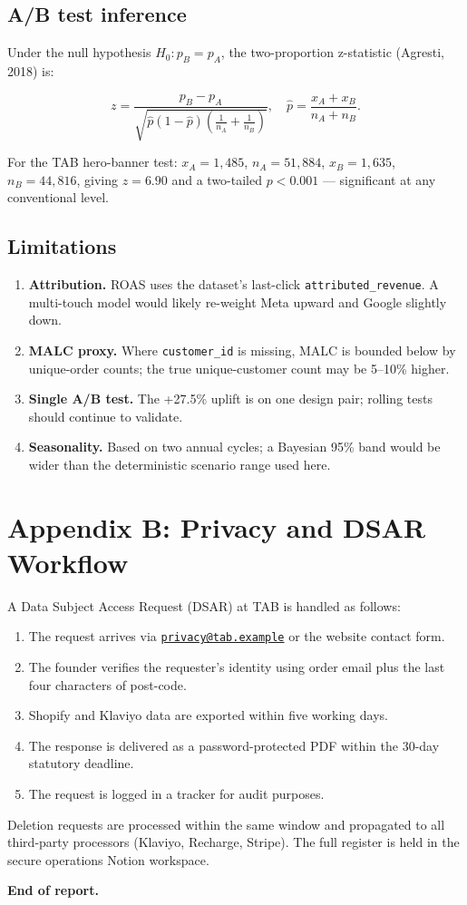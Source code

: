\documentclass[
  11pt,
]{article}
\providecommand{\tightlist}{%
  \setlength{\itemsep}{0pt}\setlength{\parskip}{0pt}}
\begin{document}
\subsection{A/B test inference}\label{ab-test-inference}

Under the null hypothesis \(H_0: p_B = p_A\), the two-proportion
z-statistic (Agresti, 2018) is:

\[z = \frac{p_B - p_A}{\sqrt{\hat{p}(1-\hat{p})\left(\tfrac{1}{n_A}+\tfrac{1}{n_B}\right)}}, \quad \hat{p} = \frac{x_A + x_B}{n_A + n_B}.\]

For the TAB hero-banner test: \(x_A = 1{,}485\), \(n_A = 51{,}884\),
\(x_B = 1{,}635\), \(n_B = 44{,}816\), giving \(z = 6.90\) and a
two-tailed \(p < 0.001\) --- significant at any conventional level.

\subsection{Limitations}\label{limitations}

\begin{enumerate}
\def\labelenumi{\arabic{enumi}.}
\tightlist
\item
  \textbf{Attribution.} ROAS uses the dataset's last-click
  \texttt{attributed\_revenue}. A multi-touch model would likely
  re-weight Meta upward and Google slightly down.
\item
  \textbf{MALC proxy.} Where \texttt{customer\_id} is missing, MALC is
  bounded below by unique-order counts; the true unique-customer count
  may be 5--10\% higher.
\item
  \textbf{Single A/B test.} The +27.5\% uplift is on one design pair;
  rolling tests should continue to validate.
\item
  \textbf{Seasonality.} Based on two annual cycles; a Bayesian 95\% band
  would be wider than the deterministic scenario range used here.
\end{enumerate}

\newpage

\section{Appendix B: Privacy and DSAR
Workflow}\label{appendix-b-privacy-and-dsar-workflow}

A Data Subject Access Request (DSAR) at TAB is handled as follows:

\begin{enumerate}
\def\labelenumi{\arabic{enumi}.}
\tightlist
\item
  The request arrives via
  \href{mailto:privacy@tab.example}{\nolinkurl{privacy@tab.example}} or
  the website contact form.
\item
  The founder verifies the requester's identity using order email plus
  the last four characters of post-code.
\item
  Shopify and Klaviyo data are exported within five working days.
\item
  The response is delivered as a password-protected PDF within the
  30-day statutory deadline.
\item
  The request is logged in a tracker for audit purposes.
\end{enumerate}

Deletion requests are processed within the same window and propagated to
all third-party processors (Klaviyo, Recharge, Stripe). The full
register is held in the secure operations Notion workspace.

\textbf{End of report.}
\end{document}
